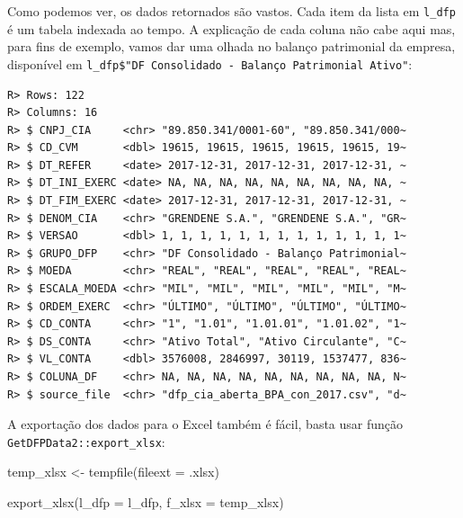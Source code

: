 \documentclass[
  11pt,
]{book}
\newenvironment{Shaded}{\begin{snugshade}}{\end{snugshade}}
\newcommand{\AttributeTok}[1]{\textcolor[rgb]{0.61,0.61,0.61}{#1}}
\newcommand{\CommentTok}[1]{\textcolor[rgb]{0.37,0.37,0.37}{\textit{#1}}}
\newcommand{\FunctionTok}[1]{\textcolor[rgb]{0,0,0}{#1}}
\newcommand{\NormalTok}[1]{#1}
\newcommand{\OtherTok}[1]{\textcolor[rgb]{0.37,0.37,0.37}{#1}}
\newcommand{\SpecialCharTok}[1]{\textcolor[rgb]{0,0,0}{#1}}
\newcommand{\StringTok}[1]{\textcolor[rgb]{0.5,0.5,0.5}{#1}}
\begin{document}
Como podemos ver, os dados retornados são vastos. Cada item da lista em \texttt{l\_dfp} é um tabela indexada ao tempo. A explicação de cada coluna não cabe aqui mas, para fins de exemplo, vamos dar uma olhada no balanço patrimonial da empresa, disponível em \texttt{l\_dfp\$"DF\ Consolidado\ -\ Balanço\ Patrimonial\ Ativo"}:

\begin{Shaded}
\end{Shaded}

\begin{verbatim}
R> Rows: 122
R> Columns: 16
R> $ CNPJ_CIA     <chr> "89.850.341/0001-60", "89.850.341/000~
R> $ CD_CVM       <dbl> 19615, 19615, 19615, 19615, 19615, 19~
R> $ DT_REFER     <date> 2017-12-31, 2017-12-31, 2017-12-31, ~
R> $ DT_INI_EXERC <date> NA, NA, NA, NA, NA, NA, NA, NA, NA, ~
R> $ DT_FIM_EXERC <date> 2017-12-31, 2017-12-31, 2017-12-31, ~
R> $ DENOM_CIA    <chr> "GRENDENE S.A.", "GRENDENE S.A.", "GR~
R> $ VERSAO       <dbl> 1, 1, 1, 1, 1, 1, 1, 1, 1, 1, 1, 1, 1~
R> $ GRUPO_DFP    <chr> "DF Consolidado - Balanço Patrimonial~
R> $ MOEDA        <chr> "REAL", "REAL", "REAL", "REAL", "REAL~
R> $ ESCALA_MOEDA <chr> "MIL", "MIL", "MIL", "MIL", "MIL", "M~
R> $ ORDEM_EXERC  <chr> "ÚLTIMO", "ÚLTIMO", "ÚLTIMO", "ÚLTIMO~
R> $ CD_CONTA     <chr> "1", "1.01", "1.01.01", "1.01.02", "1~
R> $ DS_CONTA     <chr> "Ativo Total", "Ativo Circulante", "C~
R> $ VL_CONTA     <dbl> 3576008, 2846997, 30119, 1537477, 836~
R> $ COLUNA_DF    <chr> NA, NA, NA, NA, NA, NA, NA, NA, NA, N~
R> $ source_file  <chr> "dfp_cia_aberta_BPA_con_2017.csv", "d~
\end{verbatim}

A exportação dos dados para o Excel também é fácil, basta usar função \texttt{GetDFPData2::export\_xlsx}: 

\begin{Shaded}
\begin{Highlighting}[]
\NormalTok{temp\_xlsx }\OtherTok{\textless{}{-}} \FunctionTok{tempfile}\NormalTok{(}\AttributeTok{fileext =} \StringTok{\textquotesingle{}.xlsx\textquotesingle{}}\NormalTok{)}

\FunctionTok{export\_xlsx}\NormalTok{(}\AttributeTok{l\_dfp =}\NormalTok{ l\_dfp, }\AttributeTok{f\_xlsx =}\NormalTok{ temp\_xlsx)}
\end{Highlighting}
\end{Shaded}
\end{document}

